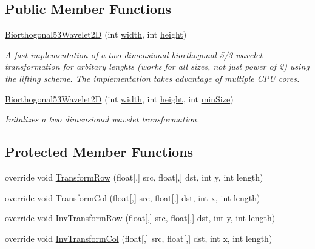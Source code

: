 \subsection*{\-Public \-Member \-Functions}
\begin{DoxyCompactItemize}
\item 
\hyperlink{class_turbo_wavelets_1_1_biorthogonal53_wavelet2_d_a8783eb5b8e032cd8cf75c5a1bb80bba0}{\-Biorthogonal53\-Wavelet2\-D} (int \hyperlink{class_turbo_wavelets_1_1_wavelet2_d_aaa4b3711957fe1798980e6891331a08d}{width}, int \hyperlink{class_turbo_wavelets_1_1_wavelet2_d_afb2aa87b89b82f329357cbdc0cde18a8}{height})
\begin{DoxyCompactList}\small\item\em \-A fast implementation of a two-\/dimensional biorthogonal 5/3 wavelet transformation for arbitary lenghts (works for all sizes, not just power of 2) using the lifting scheme. \-The implementation takes advantage of multiple \-C\-P\-U cores. \end{DoxyCompactList}\item 
\hyperlink{class_turbo_wavelets_1_1_biorthogonal53_wavelet2_d_a2d9bf97c2211d5859b3a53835bea7888}{\-Biorthogonal53\-Wavelet2\-D} (int \hyperlink{class_turbo_wavelets_1_1_wavelet2_d_aaa4b3711957fe1798980e6891331a08d}{width}, int \hyperlink{class_turbo_wavelets_1_1_wavelet2_d_afb2aa87b89b82f329357cbdc0cde18a8}{height}, int \hyperlink{class_turbo_wavelets_1_1_wavelet2_d_af5148ef1a46dd5694ccea13aa8f1b9e2}{min\-Size})
\begin{DoxyCompactList}\small\item\em \-Initalizes a two dimensional wavelet transformation. \end{DoxyCompactList}\end{DoxyCompactItemize}
\subsection*{\-Protected \-Member \-Functions}
\begin{DoxyCompactItemize}
\item 
override void \hyperlink{class_turbo_wavelets_1_1_biorthogonal53_wavelet2_d_acec9bb2730e6dee78c8f6d5c8d79a523}{\-Transform\-Row} (float\mbox{[},\mbox{]} src, float\mbox{[},\mbox{]} dst, int y, int length)
\item 
override void \hyperlink{class_turbo_wavelets_1_1_biorthogonal53_wavelet2_d_aa93cd7f9ac110e04678a5313336fb73f}{\-Transform\-Col} (float\mbox{[},\mbox{]} src, float\mbox{[},\mbox{]} dst, int x, int length)
\item 
override void \hyperlink{class_turbo_wavelets_1_1_biorthogonal53_wavelet2_d_a74b2789642a900fcfab4f47e023329ed}{\-Inv\-Transform\-Row} (float\mbox{[},\mbox{]} src, float\mbox{[},\mbox{]} dst, int y, int length)
\item 
override void \hyperlink{class_turbo_wavelets_1_1_biorthogonal53_wavelet2_d_a2f52053d7f8f2da84b0ca6964481bd06}{\-Inv\-Transform\-Col} (float\mbox{[},\mbox{]} src, float\mbox{[},\mbox{]} dst, int x, int length)
\end{DoxyCompactItemize}
